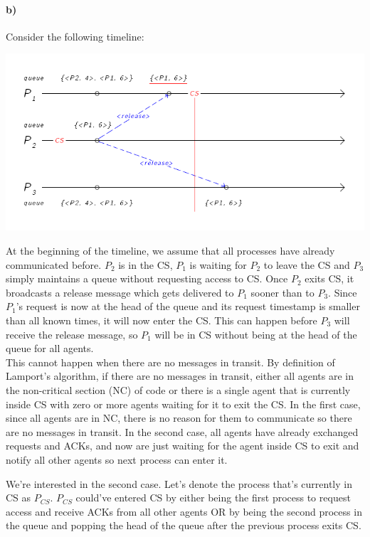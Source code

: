 \documentclass[10pt,letter]{article}
\begin{document}
\pagebreak

\paragraph{b)} Consider the following timeline:

\includegraphics[width=\textwidth,height=\textheight,keepaspectratio]{hw5_problem2_b}

At the beginning of the timeline, we assume that all processes have already communicated before. $P_2$ is in the CS, $P_1$ is waiting for $P_2$ to leave the CS and $P_3$ simply maintains a queue without requesting access to CS. Once $P_2$ exits CS, it broadcasts a release message which gets delivered to $P_1$ sooner than to $P_3$. Since $P_1$'s request is now at the head of the queue and its request timestamp is smaller than all known times, it will now enter the CS. This can happen before $P_3$ will receive the release message, so $P_1$ will be in CS without being at the head of the queue for all agents.
\\

This cannot happen when there are no messages in transit. By definition of Lamport's algorithm, if there are no messages in transit, either all agents are in the non-critical section (NC) of code or there is a single agent that is currently inside CS with zero or more agents waiting for it to exit the CS. In the first case, since all agents are in NC, there is no reason for them to communicate so there are no messages in transit. In the second case, all agents have already exchanged requests and ACKs, and now are just waiting for the agent inside CS to exit and notify all other agents so next process can enter it.

We're interested in the second case. Let's denote the process that's currently in CS as $P_{CS}$. $P_{CS}$ could've entered CS by either being the first process to request access and receive ACKs from all other agents OR by being the second process in the queue and popping the head of the queue after the previous process exits CS.
\end{document}
